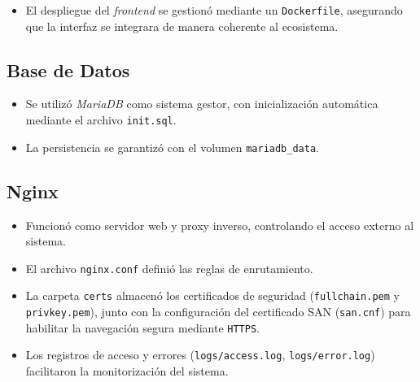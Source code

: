 \documentclass[letter,oneside,12pt,spanish]{report}
\begin{document}
\begin{itemize}
	\item El despliegue del \textit{frontend} se gestionó mediante un \texttt{Dockerfile}, asegurando que la interfaz se integrara de manera coherente al ecosistema.
\end{itemize}

\subsection{Base de Datos}
\begin{itemize}
    \item Se utilizó \textit{MariaDB} como sistema gestor, con inicialización automática mediante el archivo \texttt{init.sql}.
    \item La persistencia se garantizó con el volumen \texttt{mariadb\_data}.
\end{itemize}

\subsection{Nginx}
\begin{itemize}
    \item Funcionó como servidor web y proxy inverso, controlando el acceso externo al sistema.
    \item El archivo \texttt{nginx.conf} definió las reglas de enrutamiento.
    \item La carpeta \texttt{certs} almacenó los certificados de seguridad (\texttt{fullchain.pem} y \texttt{privkey.pem}), junto con la configuración del certificado SAN (\texttt{san.cnf}) para habilitar la navegación segura mediante \texttt{HTTPS}.
    \item Los registros de acceso y errores (\texttt{logs/access.log}, \texttt{logs/error.log}) facilitaron la monitorización del sistema.
\end{itemize}
\end{document}
